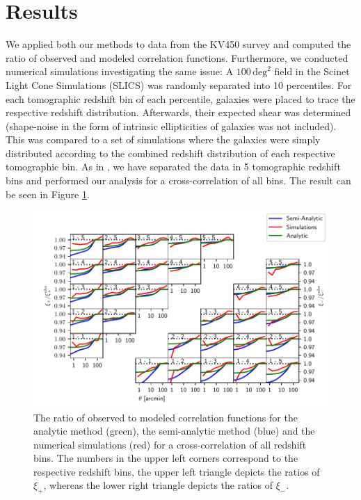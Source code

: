 \documentclass[referee]{aa} %
\renewcommand{\[}{\begin{equation}}
\renewcommand{\]}{\end{equation}}
\renewcommand{\rm}{\mathrm}
\begin{document}
\section{Results}
\label{sec:results}
We applied both our methods to data from the KV450 survey and computed the ratio of observed and modeled correlation functions. Furthermore, we conducted numerical simulations investigating the same issue: A $100\,\rm{deg}^2$ field in the Scinet Light Cone Simulations (SLICS) \citep{2018MNRAS.481.1337H} was randomly separated into 10 percentiles. For each tomographic redshift bin of each percentile, galaxies were placed to trace the respective redshift distribution. Afterwards, their expected shear was determined (shape-noise in the form of intrinsic ellipticities of galaxies was not included). This was compared to a set of simulations where the galaxies were simply distributed according to the combined redshift distribution of each respective tomographic bin. As in \citet{2018arXiv181206076H}, we have separated the data in 5 tomographic redshift bins and performed our analysis for a cross-correlation of all bins. The result can be seen in Figure \ref{fig:all_xis}.
	\begin{figure}
	\centering
	\includegraphics[width=1\textwidth]{images/allxis_0111.pdf}
	\caption{The ratio of observed to modeled correlation functions for the analytic method (green), the semi-analytic method (blue) and the numerical simulations (red) for a cross-correlation of all redshift bins. The numbers in the upper left corners correspond to the respective redshift bins, the upper left triangle depicts the ratios of $\xi_+$, whereas the lower right triangle depicts the ratios of $\xi_-$.}
	\label{fig:all_xis}
	\end{figure}
\end{document}
